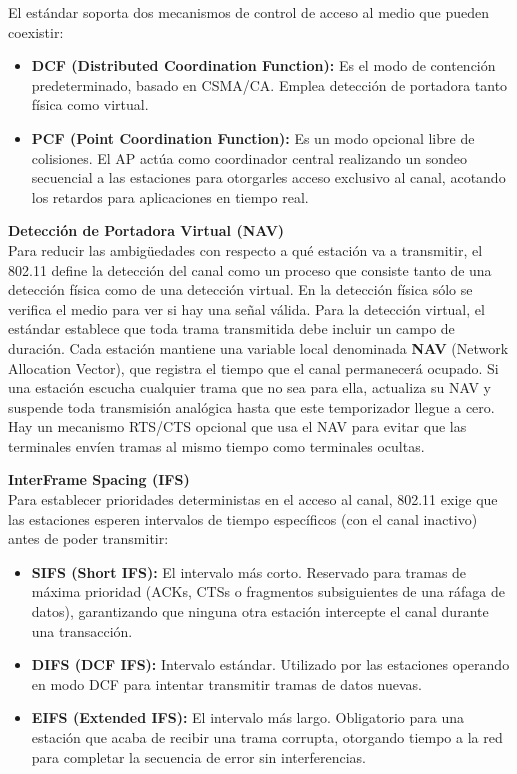 El estándar soporta dos mecanismos de control de acceso al medio que pueden coexistir:
\begin{itemize}
    \item \textbf{DCF (Distributed Coordination Function):} Es el modo de contención predeterminado, basado en CSMA/CA. Emplea detección de portadora tanto física como virtual.
    \item \textbf{PCF (Point Coordination Function):} Es un modo opcional libre de colisiones. El AP actúa como coordinador central realizando un sondeo  secuencial a las estaciones para otorgarles acceso exclusivo al canal, acotando los retardos para aplicaciones en tiempo real.
\end{itemize}

\textbf{Detección de Portadora Virtual (NAV)}\\
Para reducir las ambigüedades con respecto a qué estación va a transmitir, el 802.11 define la detección del canal como un proceso que consiste tanto de una detección física como de una detección virtual. En la detección física sólo se verifica el medio para ver si hay una señal válida. Para la detección virtual, el estándar establece que toda trama transmitida debe incluir un campo de duración. Cada estación mantiene una variable local denominada \textbf{NAV} (Network Allocation Vector), que registra el tiempo que el canal permanecerá ocupado. Si una estación escucha cualquier trama que no sea para ella, actualiza su NAV y suspende toda transmisión analógica hasta que este temporizador llegue a cero. Hay un mecanismo RTS/CTS opcional que usa el NAV para evitar que las terminales envíen tramas al mismo tiempo como terminales ocultas.

\textbf{InterFrame Spacing (IFS)}\\
Para establecer prioridades deterministas en el acceso al canal, 802.11 exige que las estaciones esperen intervalos de tiempo específicos (con el canal inactivo) antes de poder transmitir:
\begin{itemize}
    \item \textbf{SIFS (Short IFS):} El intervalo más corto. Reservado para tramas de máxima prioridad (ACKs, CTSs o fragmentos subsiguientes de una ráfaga de datos), garantizando que ninguna otra estación intercepte el canal durante una transacción.
    \item \textbf{DIFS (DCF IFS):} Intervalo estándar. Utilizado por las estaciones operando en modo DCF para intentar transmitir tramas de datos nuevas.
    \item \textbf{EIFS (Extended IFS):} El intervalo más largo. Obligatorio para una estación que acaba de recibir una trama corrupta, otorgando tiempo a la red para completar la secuencia de error sin interferencias.
\end{itemize}

